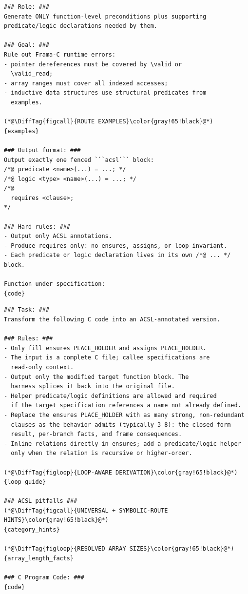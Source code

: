
\begin{tcolorbox}[promptboxcompact, title={Precondition fallback prompt}]
\begin{lstlisting}[style=PromptInnerCompact]
### Role: ###
Generate ONLY function-level preconditions plus supporting
predicate/logic declarations needed by them.

### Goal: ###
Rule out Frama-C runtime errors:
- pointer dereferences must be covered by \valid or
  \valid_read;
- array ranges must cover all indexed accesses;
- inductive data structures use structural predicates from
  examples.

(*@\DiffTag{figcall}{ROUTE EXAMPLES}\color{gray!65!black}@*)
{examples}

### Output format: ###
Output exactly one fenced ```acsl``` block:
/*@ predicate <name>(...) = ...; */
/*@ logic <type> <name>(...) = ...; */
/*@
  requires <clause>;
*/

### Hard rules: ###
- Output only ACSL annotations.
- Produce requires only: no ensures, assigns, or loop invariant.
- Each predicate or logic declaration lives in its own /*@ ... */ block.

Function under specification:
{code}
\end{lstlisting}
\end{tcolorbox}


\begin{tcolorbox}[promptboxcompact, title={Postcondition / assignment generation prompt}]
\begin{lstlisting}[style=PromptInnerCompact]
### Task: ###
Transform the following C code into an ACSL-annotated version.

### Rules: ###
- Only fill ensures PLACE_HOLDER and assigns PLACE_HOLDER.
- The input is a complete C file; callee specifications are
  read-only context.
- Output only the modified target function block. The
  harness splices it back into the original file.
- Helper predicate/logic definitions are allowed and required
  if the target specification references a name not already defined.
- Replace the ensures PLACE_HOLDER with as many strong, non-redundant
  clauses as the behavior admits (typically 3-8): the closed-form
  result, per-branch facts, and frame consequences.
- Inline relations directly in ensures; add a predicate/logic helper
  only when the relation is recursive or higher-order.

(*@\DiffTag{figloop}{LOOP-AWARE DERIVATION}\color{gray!65!black}@*)
{loop_guide}

### ACSL pitfalls ###
(*@\DiffTag{figcall}{UNIVERSAL + SYMBOLIC-ROUTE HINTS}\color{gray!65!black}@*)
{category_hints}

(*@\DiffTag{figloop}{RESOLVED ARRAY SIZES}\color{gray!65!black}@*)
{array_length_facts}

### C Program Code: ###
{code}
\end{lstlisting}
\end{tcolorbox}

